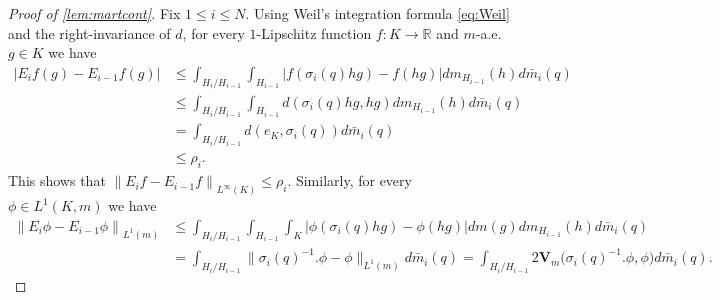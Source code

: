 \documentclass[10pt,a4paper]{amsart}
\begin{document}
\begin{proof}[Proof of \cref{lem:martcont}]
Fix \(1\leq i\leq N\). Using Weil's integration formula \eqref{eq:Weil} and the right-invariance of \(d\), for every \(1\)-Lipschitz function \(f:K\to\mathbb{R}\) and \(m\)-a.e. \(g\in K\) we have
\begin{align*}
\left|E_{i}f\left(g\right)-E_{i-1}f\left(g\right)\right|
&\leq\int_{H_{i}/H_{i-1}}\int_{H_{i-1}}\left|f\left(\sigma_{i}\left(q\right)hg\right)-f\left(hg\right)\right|dm_{H_{i-1}}\left(h\right)d\bar{m}_{i}\left(q\right)\\
&\leq\int_{H_{i}/H_{i-1}}\int_{H_{i-1}}d\left(\sigma_{i}\left(q\right)hg,hg\right)dm_{H_{i-1}}\left(h\right)d\bar{m}_{i}\left(q\right)\\
&=\int_{H_{i}/H_{i-1}}d\left(e_{K},\sigma_{i}\left(q\right)\right)d\bar{m}_{i}\left(q\right)\\
&\leq\rho_{i}.
\end{align*}
This shows that \(\left\|E_{i}f-E_{i-1}f\right\|_{L^{\infty}\left(K\right)}\leq\rho_{i}\). Similarly, for every \(\phi\in L^{1}\left(K,m\right)\) we have
\begin{align*}
\left\|E_{i}\phi-E_{i-1}\phi\right\|_{L^{1}\left(m\right)}
&\leq\int_{H_{i}/H_{i-1}}\int_{H_{i-1}}\int_{K}\left|\phi\left(\sigma_{i}\left(q\right)hg\right)-\phi\left(hg\right)\right|dm\left(g\right)dm_{H_{i-1}}\left(h\right)d\bar{m}_{i}\left(q\right)\\
&=\int_{H_{i}/H_{i-1}}\big\|\sigma_{i}\left(q\right)^{-1}.\phi-\phi\big\|_{L^{1}\left(m\right)}d\bar{m}_{i}\left(q\right)=\int_{H_{i}/H_{i-1}}2\mathbf{V}_{m}\big(\sigma_{i}\left(q\right)^{-1}.\phi,\phi\big)d\bar{m}_{i}\left(q\right).
\end{align*}


\end{proof}
\end{document}

